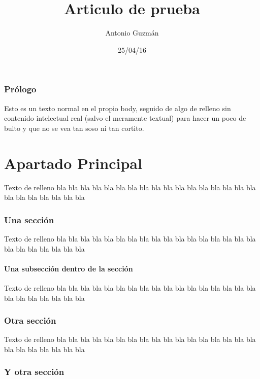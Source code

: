 \documentclass[a4paper,11pt]{article}
\begin{document}
  \title{Articulo de prueba}

  \author{Antonio Guzmán}

  \date{25/04/16}
\maketitle%
\tableofcontents %
\section{Prólogo}
Esto es un texto normal en el propio body, seguido de algo de relleno sin contenido intelectual real (salvo el meramente textual)
 para hacer un poco de bulto y que no se vea tan soso ni tan cortito.
\part{Apartado Principal} %

Texto de relleno bla bla bla bla bla bla bla bla bla bla bla bla bla bla bla bla bla bla bla bla bla bla bla bla

\section{Una sección}%

Texto de relleno bla bla bla bla bla bla bla bla bla bla bla bla bla bla bla bla bla bla bla bla bla bla bla bla

\subsection{Una subsección dentro de la sección}%

Texto de relleno bla bla bla bla bla bla bla bla bla bla bla bla bla bla bla bla bla bla bla bla bla bla bla bla

\section{Otra sección}

Texto de relleno bla bla bla bla bla bla bla bla bla bla bla bla bla bla bla bla bla bla bla bla bla bla bla bla

\section{Y otra sección}
\end{document}
